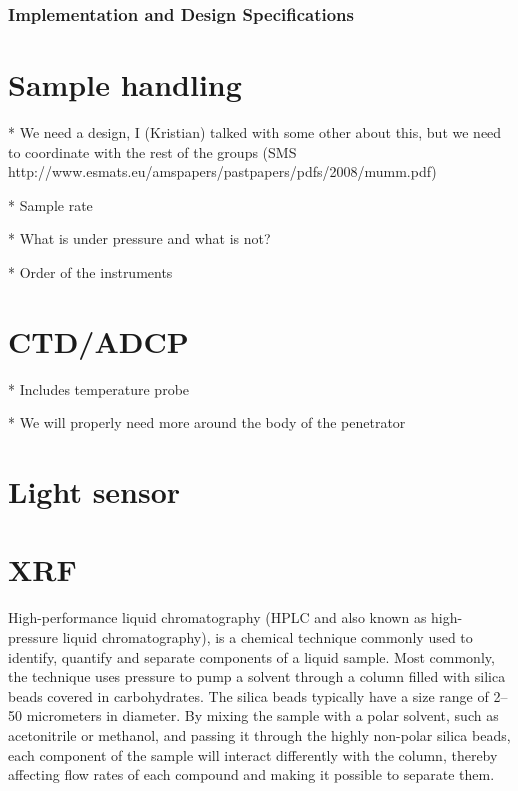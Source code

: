 
\subsubsection{Implementation and Design Specifications}

\section{Sample handling} %



* We need a design, I (Kristian) talked with some other about this, but we need to coordinate with the rest of the groups
   (SMS http://www.esmats.eu/amspapers/pastpapers/pdfs/2008/mumm.pdf)

* Sample rate

* What is under pressure and what is not?

* Order of the instruments



\section{CTD/ADCP}

* Includes temperature probe

    * We will properly need more around the body of the penetrator

\section{Light sensor}



\section{XRF}

High-performance liquid chromatography (HPLC and also known as high-pressure liquid chromatography), is a chemical technique commonly used to identify, quantify and separate components of a liquid sample. Most commonly, the technique uses pressure to pump a solvent through a column filled with silica beads covered in carbohydrates. The silica beads typically have a size range of 2–50 micrometers in diameter. By mixing the sample with a polar solvent, such as acetonitrile or methanol, and passing it through the highly non-polar silica beads, each component of the sample will interact differently with the column, thereby affecting flow rates of each compound and making it possible to separate them. 

